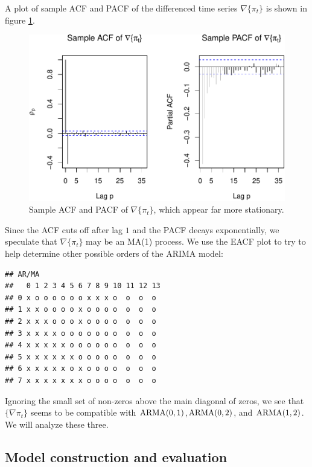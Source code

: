 \documentclass[final,
  11pt,
]{article}
\begin{document}
A plot of sample ACF and PACF of the differenced time series $\nabla \{\pi_t\}$
is shown in figure \ref{fig:f3}.

\begin{figure}
\includegraphics{paper_files/figure-latex/unnamed-chunk-6-1.pdf}
\caption{Sample ACF and PACF of $\nabla \{\pi_t\}$, which appear far more stationary.}
\label{fig:f3}
\end{figure}


Since the ACF cuts off after lag \(1\) and the PACF decays
exponentially, we speculate that \(\nabla\{\pi_t\}\) may be an MA(1)
process. We use the EACF plot to try to help determine other possible
orders of the ARIMA model:

\begin{verbatim}
## AR/MA
##   0 1 2 3 4 5 6 7 8 9 10 11 12 13
## 0 x o o o o o o x x x o  o  o  o 
## 1 x x o o o o x o o o o  o  o  o 
## 2 x x x o o o x o o o o  o  o  o 
## 3 x x x x o o o o o o o  o  o  o 
## 4 x x x x x o o o o o o  o  o  o 
## 5 x x x x x x o o o o o  o  o  o 
## 6 x x x x x o x o o o o  o  o  o 
## 7 x x x x x x x o o o o  o  o  o
\end{verbatim}

Ignoring the small set of non-zeros above the main diagonal of zeros,
we see that \(\{\nabla \pi_t\}\) seems to be compatible with
\(\operatorname{ARMA}(0,1)\),\(\operatorname{ARMA}(0,2)\), and \(\operatorname{ARMA}(1,2)\). We will analyze these
three.

\hypertarget{model-construction-and-evaluation}{%
\subsection{Model construction and
evaluation}\label{model-construction-and-evaluation}}
\end{document}

